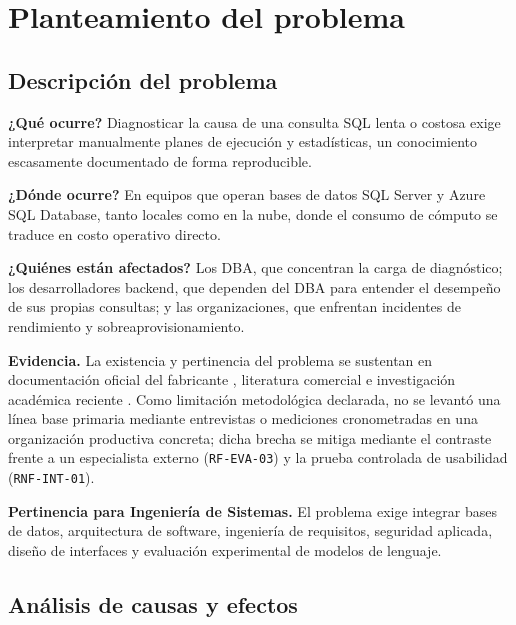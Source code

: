 \documentclass[12pt,a4paper]{article}
\begin{document}
\section{Planteamiento del problema}

\subsection{Descripción del problema}

\textbf{¿Qué ocurre?} Diagnosticar la causa de una consulta SQL lenta o costosa exige interpretar manualmente planes de ejecución y estadísticas, un conocimiento escasamente documentado de forma reproducible.

\textbf{¿Dónde ocurre?} En equipos que operan bases de datos SQL Server y Azure SQL Database, tanto locales como en la nube, donde el consumo de cómputo se traduce en costo operativo directo.

\textbf{¿Quiénes están afectados?} Los DBA, que concentran la carga de diagnóstico; los desarrolladores backend, que dependen del DBA para entender el desempeño de sus propias consultas; y las organizaciones, que enfrentan incidentes de rendimiento y sobreaprovisionamiento.

\textbf{Evidencia.} La existencia y pertinencia del problema se sustentan en documentación oficial del fabricante \cite{ms-apc-2026}, literatura comercial \cite{sqlyard-2025,idera-2025} e investigación académica reciente \cite{zhou-dbot,yoon-dbsherlock}. Como limitación metodológica declarada, no se levantó una línea base primaria mediante entrevistas o mediciones cronometradas en una organización productiva concreta; dicha brecha se mitiga mediante el contraste frente a un especialista externo (\texttt{RF-EVA-03}) y la prueba controlada de usabilidad (\texttt{RNF-INT-01}).

\textbf{Pertinencia para Ingeniería de Sistemas.} El problema exige integrar bases de datos, arquitectura de software, ingeniería de requisitos, seguridad aplicada, diseño de interfaces y evaluación experimental de modelos de lenguaje.

\subsection{Análisis de causas y efectos}
\end{document}
